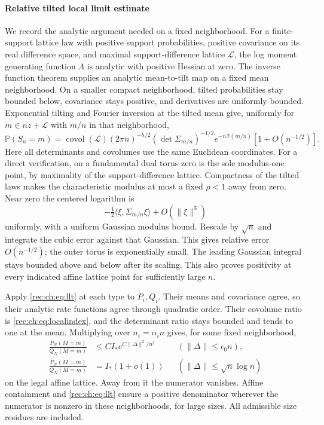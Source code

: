 \documentclass[11pt]{article}
\theoremstyle{definition}
\theoremstyle{remark}
\newcommand{\1}{\mathbf 1}
\providecommand{\Prob}{\mathbb P}
\begin{document}
\paragraph{Relative tilted local limit estimate}
We record the analytic argument needed on a fixed neighborhood. For a finite-support lattice law with positive support probabilities, positive covariance on its real difference space, and maximal support-difference lattice $\mathcal L$, the log moment generating function $\Lambda$ is analytic with positive Hessian at zero. The inverse function theorem supplies an analytic mean-to-tilt map on a fixed mean neighborhood. On a smaller compact neighborhood, tilted probabilities stay bounded below, covariance stays positive, and derivatives are uniformly bounded. Exponential tilting and Fourier inversion at the tilted mean give, uniformly for $m\in nz+\mathcal L$ with $m/n$ in that neighborhood,
\begin{equation}\label{rec:ch:eq:llt}
 \Prob(S_n=m)=\operatorname{covol}(\mathcal L)(2\pi n)^{-h/2}
 (\det\Sigma_{m/n})^{-1/2}e^{-n\mathcal I(m/n)}
 [1+O(n^{-1/2})].
\end{equation}
Here all determinants and covolumes use the same Euclidean coordinates. For a direct verification, on a fundamental dual torus zero is the sole modulus-one point, by maximality of the support-difference lattice. Compactness of the tilted laws makes the characteristic modulus at most a fixed $\rho<1$ away from zero. Near zero the centered logarithm is
\[
 -\tfrac12\langle\xi,\Sigma_{m/n}\xi\rangle+O(\|\xi\|^3)
\]
uniformly, with a uniform Gaussian modulus bound. Rescale by $\sqrt n$ and integrate the cubic error against that Gaussian. This gives relative error $O(n^{-1/2})$; the outer torus is exponentially small. The leading Gaussian integral stays bounded above and below after its scaling. This also proves positivity at every indicated affine lattice point for sufficiently large $n$.

Apply \eqref{rec:ch:eq:llt} at each type to $P_i,Q_i$. Their means and covariance agree, so their analytic rate functions agree through quadratic order. Their covolume ratio is \eqref{rec:ch:eq:localindex}, and the determinant ratio stays bounded and tends to one at the mean. Multiplying over $n_i=\alpha_i n$ gives, for some fixed neighborhood,
\begin{align}
 \frac{P_N(M=m)}{Q_N(M=m)}&\le C I_*e^{C\|\Delta\|^3/n^2}
 &&(\|\Delta\|\le\epsilon_0n),\label{rec:ch:eq:cubic}\\
 \frac{P_N(M=m)}{Q_N(M=m)}&=I_*(1+o(1))
 &&(\|\Delta\|\le\sqrt n\log n)\label{rec:ch:eq:ratio}
\end{align}
on the legal affine lattice. Away from it the numerator vanishes. Affine containment and \eqref{rec:ch:eq:llt} ensure a positive denominator wherever the numerator is nonzero in these neighborhoods, for large sizes. All admissible size residues are included.
\end{document}
